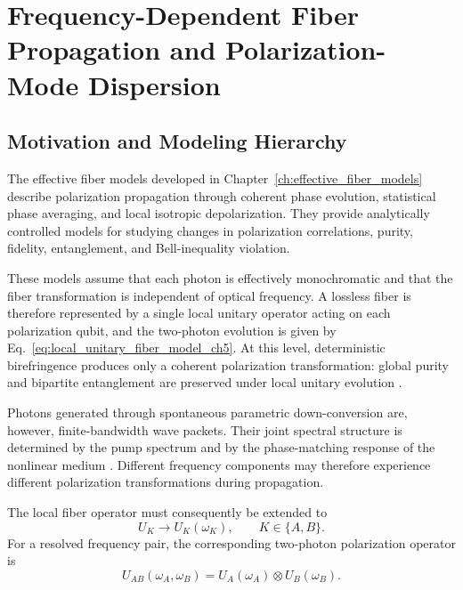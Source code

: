 
\chapter{Frequency-Dependent Fiber Propagation and Polarization-Mode Dispersion}
\label{ch:frequency_dependent_fiber_propagation}


\section{Motivation and Modeling Hierarchy}
\label{sec:pmd_motivation_and_hierarchy}

The effective fiber models developed in
Chapter~\ref{ch:effective_fiber_models} describe polarization propagation
through coherent phase evolution, statistical phase averaging, and local
isotropic depolarization. They provide analytically controlled models for
studying changes in polarization correlations, purity, fidelity,
entanglement, and Bell-inequality violation.

These models assume that each photon is effectively monochromatic and that
the fiber transformation is independent of optical frequency. A lossless
fiber is therefore represented by a single local unitary operator acting on
each polarization qubit, and the two-photon evolution is given by
Eq.~\eqref{eq:local_unitary_fiber_model_ch5}. At this level, deterministic
birefringence produces only a coherent polarization transformation: global
purity and bipartite entanglement are preserved under local unitary evolution
\cite{nielsen_chuang_qcqi}.

\medskip

Photons generated through spontaneous parametric down-conversion are,
however, finite-bandwidth wave packets. Their joint spectral structure is
determined by the pump spectrum and by the phase-matching response of the
nonlinear medium
\cite{grice_walmsley_spdc_spectral_1997}. Different frequency components may
therefore experience different polarization transformations during
propagation.

The local fiber operator must consequently be extended to
%
\begin{equation}
    U_K
    \longrightarrow
    U_K(\omega_K),
    \qquad
    K\in\{A,B\}.
    \label{eq:frequency_dependent_local_unitary}
\end{equation}
%
For a resolved frequency pair, the corresponding two-photon polarization
operator is
%
\begin{equation}
    U_{AB}(\omega_A,\omega_B)
    =
    U_A(\omega_A)
    \otimes
    U_B(\omega_B).
    \label{eq:frequency_dependent_two_arm_unitary}
\end{equation}

